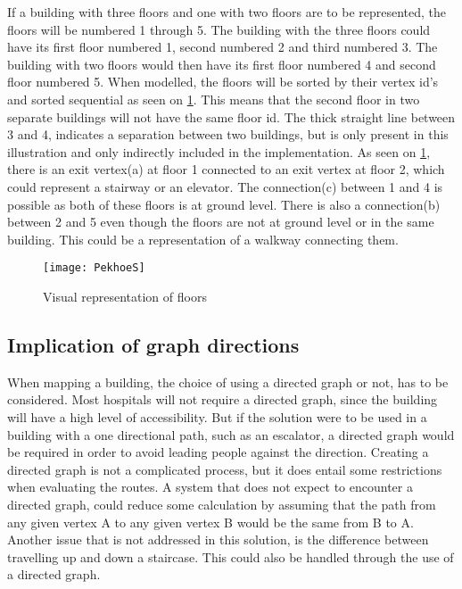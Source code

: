 If a building with three floors and one with two floors are to be represented, the floors will be numbered 1 through 5. The building with the three floors could have its first floor numbered 1, second numbered 2 and third numbered 3. The building with two floors would then have its first floor numbered 4 and second floor numbered 5. When modelled, the floors will be sorted by their vertex id's and sorted sequential as seen on \cref{fig:PekhoeS}. This means that the second floor in two separate buildings will not have the same floor id. The thick straight line between 3 and 4, indicates a separation between two buildings, but is only present in this illustration and only indirectly included in the implementation. As seen on \cref{fig:PekhoeS}, there is an exit vertex(a) at floor 1 connected to an exit vertex at floor 2, which could represent a stairway or an elevator. The connection(c) between 1 and 4 is possible as both of these floors is at ground level. There is also a connection(b) between 2 and 5 even though the floors are not at ground level or in the same building. This could be a representation of a walkway connecting them.


\begin{figure}[ht!]
    \centering
    \texttt{[image: PekhoeS]}
    \caption{Visual representation of floors}
    \label{fig:PekhoeS}
  \end{figure}


\subsection{Implication of graph directions}

When mapping a building, the choice of using a directed graph or not, has to be considered. Most hospitals will not require a directed graph, since the building will have a high level of accessibility. But if the solution were to be used in a building with a one directional path, such as an escalator, a directed graph would be required in order to avoid leading people against the direction. Creating a directed graph is not a complicated process, but it does entail some restrictions when evaluating the routes. A system that does not expect to encounter a directed graph, could reduce some calculation by assuming that the path from any given vertex A to any given vertex B would be the same from B to A. Another issue that is not addressed in this solution, is the difference between travelling up and down a staircase. This could also be handled through the use of a directed graph.






